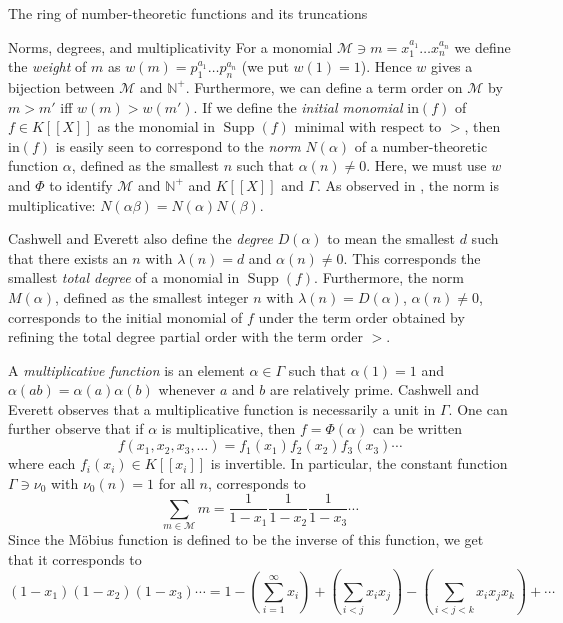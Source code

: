 \documentclass[reqno,10pt]{amsart}
\newcommand{\init}{\mathrm{in}}
\theoremstyle{definition}
\theoremstyle{remark}
\theoremstyle{plain}
\newcommand{\Nat}{{\mathbb{N}}}
\newcommand{\M}{\mathcal{M}}
\newcommand{\supp}{\operatorname*{Supp}}
\begin{document}
\begin{section}{The ring of number-theoretic functions  and its
  truncations}   
\begin{subsection}{Norms, degrees, and multiplicativity}
For a monomial \(\M \ni m = x_1^{a_1}\dots x_n^{a_n}\) we define the
\emph{weight} of \(m\) as 
\(w(m) = p_1^{a_1}\dots p_n^{a_n}\) (we put \(w(1)=1\)). Hence \(w\)
gives a bijection 
between \(\M\) and \(\Nat^+\).
Furthermore, we can define a term order on \(\M\) by \(m > m'\) iff
\(w(m) > w(m')\). If we define the \emph{initial monomial}
\(\init(f)\) 
of \(f \in K[[X]]\) as the monomial in \(\supp(f)\) minimal with
respect to \(>\), then \(\init(f)\) is easily seen to correspond to the
\emph{norm} \(N(\alpha)\) of a number-theoretic function \(\alpha\),
defined as the 
smallest \(n\) such that \(\alpha(n) \neq 0\). Here, we must use \(w\)
and \(\Phi\) to identify \(\M\) and \(\Nat^+\) and \(K[[X]]\) and
\(\Gamma\). As observed in \cite{NumThe}, the norm is multiplicative:
\(N(\alpha \beta) = N(\alpha) N(\beta)\).

Cashwell and Everett also define the \emph{degree} \(D(\alpha)\) to
mean the smallest \(d\) such that there exists an \(n\) with
\(\lambda(n)=d\) and \(\alpha(n) \neq 0\). This corresponds the
smallest \emph{total degree} of a monomial in
\(\supp(f)\). Furthermore, 
the norm \(M(\alpha)\), defined as the smallest integer \(n\) with
\(\lambda(n)=D(\alpha)\), \(\alpha(n) \neq 0\), corresponds to the
initial monomial of \(f\) under the term order obtained by refining
the total degree partial order with the term order \(>\).

A \emph{multiplicative function} is an element \(\alpha \in \Gamma\)
such 
that \(\alpha(1)=1\) and \(\alpha(ab) = \alpha(a)\alpha(b)\) whenever
\(a\) and \(b\) are 
relatively prime. Cashwell and Everett observes that a multiplicative
function is necessarily a unit in \(\Gamma\). One can further observe that
if \(\alpha\) is multiplicative, then \(f=\Phi(\alpha)\) can be
written
\begin{displaymath}
  f(x_1,x_2,x_3,\dots) = f_1(x_1) f_2(x_2) f_3(x_3) \cdots
\end{displaymath}
where each \(f_i(x_i) \in K[[x_i]]\) is invertible. In particular, the
constant function \(\Gamma \ni \nu_0\) with \(\nu_0(n)=1\) for all
\(n\), corresponds to
\begin{displaymath}
  \sum_{m \in \M} m = \frac{1}{1-x_1}\frac{1}{1-x_2}\frac{1}{1-x_3}
  \cdots 
\end{displaymath}
Since the M\"obius function is defined to be the inverse of this
function, we get that it corresponds to
\begin{displaymath}
  (1-x_1)(1-x_2)(1-x_3)\cdots = 1 - (\sum_{i=1}^\infty x_i) + 
  (\sum_{i < j} x_i x_j) - (\sum_{i < j < k} x_i x_j x_k) + \cdots
\end{displaymath}
\end{subsection}






\end{section}
\end{document}
